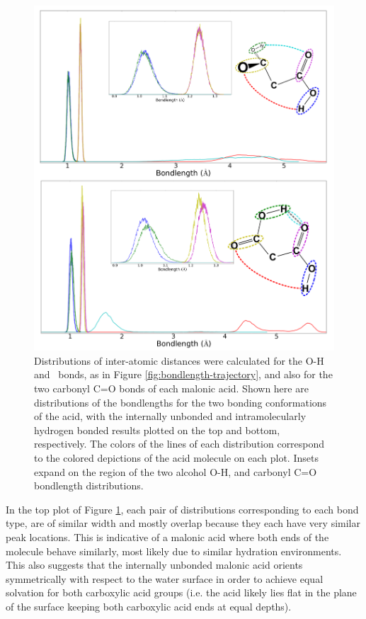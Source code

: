 \begin{figure}[h!]
	\begin{center}
		\includegraphics[scale=1.0]{images/bond-length/BondLengthDistros.png}
		\caption{Distributions of inter-atomic distances were calculated for the O-H and \ocarbh~bonds, as in Figure \ref{fig:bondlength-trajectory}, and also for the two carbonyl C=O bonds of each malonic acid. Shown here are distributions of the bondlengths for the two bonding conformations of the acid, with the internally unbonded and intramolecularly hydrogen bonded results plotted on the top and bottom, respectively. The colors of the lines of each distribution correspond to the colored depictions of the acid molecule on each plot. Insets expand on the region of the two alcohol O-H, and carbonyl C=O bondlength distributions.}
		\label{fig:bondlength-distribution}
	\end{center}
\end{figure}

In the top plot of Figure \ref{fig:bondlength-distribution}, each pair of distributions corresponding to each bond type, are of similar width and mostly overlap because they each have very similar peak locations. This is indicative of a malonic acid where both ends of the molecule behave similarly, most likely due to similar hydration environments. This also suggests that the internally unbonded malonic acid orients symmetrically with respect to the water surface in order to achieve equal solvation for both carboxylic acid groups (i.e. the acid likely lies flat in the plane of the surface keeping both carboxylic acid ends at equal depths). 

